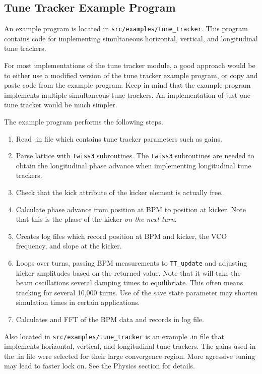 \subsection{Tune Tracker Example Program}

An example program is located in {\tt src/examples/tune\_tracker}. This program contains
code for implementing simultaneous horizontal, vertical, and longitudinal tune trackers.

For most implementations of the tune tracker module, a good approach would be to either
use a modified version of the tune tracker example program, or copy and paste code from
the example program.  Keep in mind that the example program implements multiple simultaneous
tune trackers.  An implementation of just one tune tracker would be much simpler.

The example program performs the following steps.
\begin{enumerate}
\item Read .in file which contains tune tracker parameters such as gains.
\item Parse lattice with {\tt twiss3} subroutines.  The {\tt twiss3} subroutines
are needed to obtain the longitudinal phase advance when implementing 
longitudinal tune trackers.
\item Check that the kick attribute of the kicker element is actually free.
\item Calculate phase advance from position at BPM to position at kicker.  Note that this 
is the phase of the kicker {\it on the next turn}.
\item Creates log files which record position at BPM and kicker, the VCO frequency,
and slope at the kicker.
\item Loops over turns, passing BPM measurements to {\tt TT\_update} and adjusting kicker
amplitudes based on the returned value.  Note that it will take the beam oscillations several damping times
to equilibriate.  This often means tracking for several 10,000 turns.  Use of the save state
parameter may shorten simulation times in certain applications.
\item Calculates and FFT of the BPM data and records in log file. 
\end{enumerate}

Also located in {\tt src/examples/tune\_tracker} is an example .in file that implements
horizontal, vertical, and longitudinal tune trackers.  The gains used in the .in file
were selected for their large convergence region.  More agressive tuning may lead to 
faster lock on.  See the Physics section for details.

